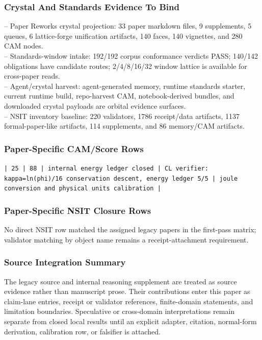 \documentclass[11pt]{article}
\begin{document}
\subsubsection*{Crystal And Standards Evidence To Bind}

\noindent{}-- Paper Reworks crystal projection: 33 paper markdown files, 9 supplements, 5 queues, 6 lattice-forge unification artifacts, 140 faces, 140 vignettes, and 280 CAM nodes.\\
\noindent{}-- Standards-window intake: 192/192 corpus conformance verdicts PASS; 140/142 obligations have candidate routes; 2/4/8/16/32 window lattice is available for cross-paper reads.\\
\noindent{}-- Agent/crystal harvest: agent-generated memory, runtime standards starter, current runtime build, repo-harvest CAM, notebook-derived bundles, and downloaded crystal payloads are orbital evidence surfaces.\\
\noindent{}-- NSIT inventory baseline: 220 validators, 1786 receipt/data artifacts, 1137 formal-paper-like artifacts, 114 supplements, and 86 memory/CAM artifacts.\\

\subsubsection*{Paper-Specific CAM/Score Rows}

\noindent\texttt{| 25 | 88 | internal energy ledger closed | CL verifier: kappa=ln(phi)/16 conservation descent, energy ledger 5/5 | joule conversion and physical units calibration |}\\

\subsubsection*{Paper-Specific NSIT Closure Rows}

No direct NSIT row matched the assigned legacy papers in the first-pass matrix; validator matching by object name remains a receipt-attachment requirement.

\subsubsection*{Source Integration Summary}

The legacy source and internal reasoning supplement are treated as source
evidence rather than manuscript prose. Their contributions enter this paper as
claim-lane entries, receipt or validator references, finite-domain statements,
and limitation boundaries. Speculative or cross-domain interpretations remain
separate from closed local results until an explicit adapter, citation,
normal-form derivation, calibration row, or falsifier is attached.
\end{document}

